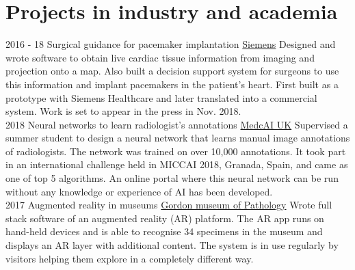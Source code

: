 \section{Projects in industry and academia}
\begin{twenty}
	\twentyitem
    	{2016 - 18}
		{}
        {Surgical guidance for pacemaker implantation}
        {\href{https://www.healthcare.siemens.co.uk/about}{Siemens}}
        {}
        {
		Designed and wrote software to obtain live cardiac tissue information from imaging and projection onto a map. Also built a decision support system for surgeons to use this information and implant pacemakers in the patient's heart. First built as a prototype with Siemens Healthcare and later translated into a commercial system. Work is set to appear in the press in Nov. 2018.}
		\\
	\twentyitem
    	{2018}
		{}
        {Neural networks to learn radiologist's annotations}
        {\href{http://www.medcai.co.uk}{MedcAI UK}}
        {
		Supervised a summer student to design a neural network that learns manual image annotations of radiologists. The network was trained on over 10,000 annotations. It took part in an international challenge held in MICCAI 2018, Granada, Spain, and came as one of top 5 algorithms. An online portal where this neural network can be run without any knowledge or experience of AI has been developed.}
		\\
	\twentyitem
    	{2017}
		{}
        {Augmented reality in museums}
        {\href{https://www.kcl.ac.uk/gordon/index.aspx}{Gordon museum of Pathology}}
        {
		Wrote full stack software of an augmented reality (AR) platform. The AR app runs on hand-held devices and is able to recognise 34 specimens in the museum and displays an AR layer with additional content. The system is in use regularly by visitors helping them explore in a completely different way. }
		\\ 


\end{twenty}
